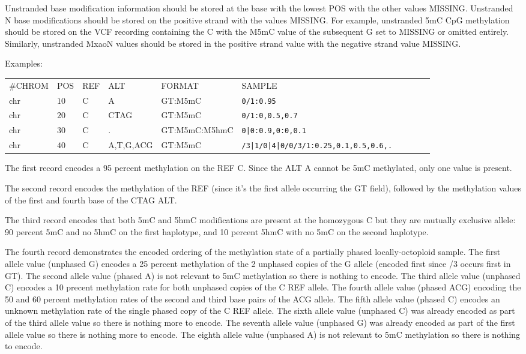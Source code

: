 \documentclass[8pt]{article}
\begin{document}
Unstranded base modification information should be stored at the base with the lowest POS with the other values MISSING.
Unstranded N base modifications should be stored on the positive strand with the values MISSING.
For example, unstranded 5mC CpG methylation should be stored on the VCF recording containing the C with the M5mC value of the subsequent G set to MISSING or omitted entirely. Similarly, unstranded MxaoN values should be stored in the positive strand value with the negative strand value MISSING.

Examples:

\vspace{0.5em}
\begin{tabular}{ l l l l l l l l l l}
	\#CHROM & POS & REF & ALT & FORMAT & SAMPLE\\
	chr & $10$ & C & A         & GT:M5mC       & \tt{0/1:0.95}\\
	chr & $20$ & C & CTAG      & GT:M5mC       & \tt{0/1:0,0.5,0.7}\\
	chr & $30$ & C & .         & GT:M5mC:M5hmC & \tt{0|0:0.9,0:0,0.1}\\
	chr & $40$ & C & A,T,G,ACG & GT:M5mC       & \tt{/3|1/0|4|0/0/3/1:0.25,0.1,0.5,0.6,.}\\
\end{tabular}

The first record encodes a 95 percent methylation on the REF C.
Since the ALT A cannot be 5mC methylated, only one value is present.

The second record encodes the methylation of the REF (since it's the first allele occurring the GT field), followed by the methylation values of the first and fourth base of the CTAG ALT.

The third record encodes that both 5mC and 5hmC modifications are present at the homozygous C but they are mutually exclusive allele: 90 percent 5mC and no 5hmC on the first haplotype, and 10 percent 5hmC with no 5mC on the second haplotype.

The fourth record demonstrates the encoded ordering of the methylation state of a partially phased locally-octoploid sample.
The first   allele value (unphased G) encodes a 25 percent methylation of the 2 unphased copies of the G allele (encoded first since /3 occurs first in GT).
The second  allele value (phased A)   is not relevant to 5mC methylation so there is nothing to encode.
The third   allele value (unphased C) encodes a 10 precent methylation rate for both unphased copies of the C REF allele.
The fourth  allele value (phased ACG) encoding the 50 and 60 percent methylation rates of the second and third base pairs of the ACG allele.
The fifth   allele value (phased C)   encodes an unknown methylation rate of the single phased copy of the C REF allele.
The sixth   allele value (unphased C) was already encoded as part of the third allele value so there is nothing more to encode.
The seventh allele value (unphased G) was already encoded as part of the first allele value so there is nothing more to encode.
The eighth  allele value (unphased A) is not relevant to 5mC methylation so there is nothing to encode.
\end{document}
